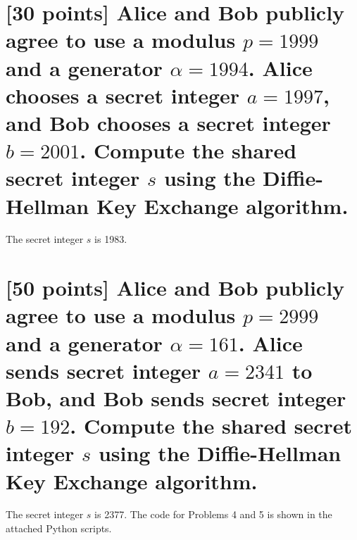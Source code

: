 \documentclass{article}
\begin{document}
\section{[30 points] Alice and Bob publicly agree to use a modulus $p=1999$ and a generator $\alpha=1994$. Alice chooses a secret integer $a= 1997$, and Bob chooses a secret integer $b =  2001$. Compute the shared secret integer $s$ using the Diffie-Hellman Key Exchange algorithm. }

The secret integer $s$ is 1983.

\section{[50 points] Alice and Bob publicly agree to use a modulus $p=2999$ and a generator $\alpha=161$. Alice sends  secret integer $a= 2341$ to Bob, and Bob sends secret integer $b =  192$. Compute the shared secret integer $s$ using the Diffie-Hellman Key Exchange algorithm. }

The secret integer $s$ is 2377.
The code for Problems 4 and 5 is shown in the attached Python scripts.
\end{document}
